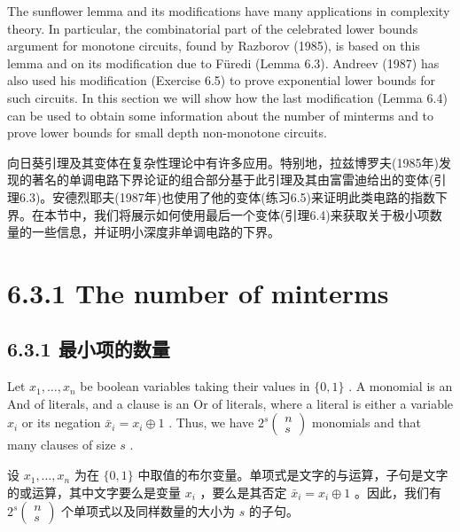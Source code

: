 \documentclass[10pt]{article}
\begin{document}
The sunflower lemma and its modifications have many applications in complexity theory. In particular, the combinatorial part of the celebrated lower bounds argument for monotone circuits, found by Razborov (1985), is based on this lemma and on its modification due to Füredi (Lemma 6.3). Andreev (1987) has also used his modification (Exercise 6.5) to prove exponential lower bounds for such circuits. In this section we will show how the last modification (Lemma 6.4) can be used to obtain some information about the number of minterms and to prove lower bounds for small depth non-monotone circuits.

\begin{tcolorbox}\relax
向日葵引理及其变体在复杂性理论中有许多应用。特别地，拉兹博罗夫(1985年)发现的著名的单调电路下界论证的组合部分基于此引理及其由富雷迪给出的变体(引理6.3)。安德烈耶夫(1987年)也使用了他的变体(练习6.5)来证明此类电路的指数下界。在本节中，我们将展示如何使用最后一个变体(引理6.4)来获取关于极小项数量的一些信息，并证明小深度非单调电路的下界。
\end{tcolorbox}

\section*{6.3.1 The number of minterms}

\begin{tcolorbox}\relax
\section*{6.3.1 最小项的数量}
\end{tcolorbox}

Let \({x}_{1},\ldots ,{x}_{n}\) be boolean variables taking their values in \(\{ 0,1\}\) . A monomial is an And of literals, and a clause is an Or of literals, where a literal is either a variable \({x}_{i}\) or its negation \({\bar{x}}_{i} = {x}_{i} \oplus  1\) . Thus, we have \({2}^{s}\left( \begin{array}{l} n \\  s \end{array}\right)\) monomials and that many clauses of size \(s\) .

\begin{tcolorbox}\relax
设 \({x}_{1},\ldots ,{x}_{n}\) 为在 \(\{ 0,1\}\) 中取值的布尔变量。单项式是文字的与运算，子句是文字的或运算，其中文字要么是变量 \({x}_{i}\) ，要么是其否定 \({\bar{x}}_{i} = {x}_{i} \oplus  1\) 。因此，我们有 \({2}^{s}\left( \begin{array}{l} n \\  s \end{array}\right)\) 个单项式以及同样数量的大小为 \(s\) 的子句。
\end{tcolorbox}
\end{document}
